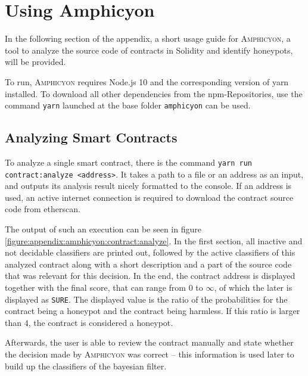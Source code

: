 \section{Using Amphicyon}
\label{appendix:amphicyon}
In the following section of the appendix, a short usage guide for \textsc{Amphicyon}, a tool to analyze the source code of contracts in Solidity and identify honeypots, will be provided.

To run, \textsc{Amphicyon} requires Node.js 10 and the corresponding version of yarn installed. To download all other dependencies from the npm-Repositories, use the command \texttt{yarn} launched at the base folder \texttt{amphicyon} can be used.

\subsection{Analyzing Smart Contracts}
To analyze a single smart contract, there is the command \texttt{yarn run contract:analyze <address>}. It takes a path to a file or an address as an input, and outputs its analysis result nicely formatted to the console. If an address is used, an active internet connection is required to download the contract source code from etherscan.

The output of such an execution can be seen in figure \ref{figure:appendix:amphicyon:contract:analyze}. In the first section, all inactive and not decidable classifiers are printed out, followed by the active classifiers of this analyzed contract along with a short description and a part of the source code that was relevant for this decision. In the end, the contract address is displayed together with the final score, that can range from \( 0 \) to \( \infty \), of which the later is displayed as \texttt{SURE}. The displayed value is the ratio of the probabilities for the contract being a honeypot and the contract being harmless. If this ratio is larger than \( 4 \), the contract is considered a honeypot.

Afterwards, the user is able to review the contract manually and state whether the decision made by \textsc{Amphicyon} was correct -- this information is used later to build up the classifiers of the bayesian filter.

